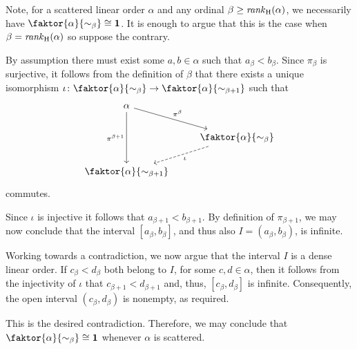 Note, for a scattered linear order $\alpha$ and any ordinal
$\beta\geq\mathit{rank}_\mathrm{H}(\alpha)$, we necessarily have
$\faktor{\alpha}{\sim_\beta}\cong\one$.  It is enough to argue that this is the
case when $\beta=\mathit{rank}_\mathrm{H}(\alpha)$ so suppose the contrary.

By assumption there must exist some $a,b\in\alpha$ such that $a_\beta<b_\beta$.
Since $\pi_\beta$ is surjective, it follows from the definition of $\beta$ that
there exists a unique isomorphism
$\iota\colon\faktor{\alpha}{\sim_\beta}\to\faktor{\alpha}{\sim_{\beta+1}}$ such
that
\begin{equation}
	\begin{tikzcd}
		\alpha\arrow[rd,"{\pi^\beta}"]\arrow[dd,"{\pi^{\beta+1}}"']&\\
		&\faktor{\alpha}{\sim_{\beta}}\arrow[ld,dashrightarrow,"\iota"]\\
		\faktor{\alpha}{\sim_{\beta+1}}&
	\end{tikzcd}
\end{equation}
commutes.

Since $\iota$ is injective it follows that $a_{\beta+1}<b_{\beta+1}$.  By
definition of $\pi_{\beta+1}$, we may now conclude that the interval
$[a_\beta,b_\beta]$, and thus also $I=(a_\beta,b_\beta)$, is infinite.

Working towards a contradiction, we now argue that the interval $I$ is a dense
linear order.  If $c_\beta<d_\beta$ both belong to $I$, for some $c,d\in\alpha$,
then it follows from the injectivity of $\iota$ that $c_{\beta+1}<d_{\beta+1}$
and, thus, $[c_\beta,d_\beta]$ is infinite.  Consequently, the open interval
$(c_\beta,d_\beta)$ is nonempty, as required.

This is the desired contradiction.  Therefore, we may conclude that
$\faktor{\alpha}{\sim_\beta}\cong\one$ whenever $\alpha$ is scattered.

